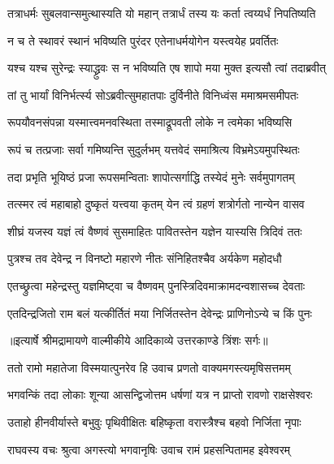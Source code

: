 \twolineshloka
{तत्राधर्मः सुबलवान्समुत्थास्यति यो महान्}
{तत्रार्धं तस्य यः कर्ता त्वय्यर्धं निपतिष्यति} %

\twolineshloka
{न च ते स्थावरं स्थानं भविष्यति पुरंदर}
{एतेनाधर्मयोगेन यस्त्वयेह प्रवर्तितः} %

\twolineshloka
{यश्च यश्च सुरेन्द्रः स्याद्ध्रुवः स न भविष्यति}
{एष शापो मया मुक्त इत्यसौ त्वां तदाब्रवीत्} %

\twolineshloka
{तां तु भार्यां विनिर्भर्त्स्य सोऽब्रवीत्सुमहातपाः}
{दुर्विनीते विनिध्वंस ममाश्रमसमीपतः} %

\twolineshloka
{रूपयौवनसंपन्ना यस्मात्त्वमनवस्थिता}
{तस्माद्रूपवती लोके न त्वमेका भविष्यसि} %

\twolineshloka
{रूपं च तत्प्रजाः सर्वा गमिष्यन्ति सुदुर्लभम्}
{यत्तवेदं समाश्रित्य विभ्रमेऽयमुपस्थितः} %

\twolineshloka
{तदा प्रभृति भूयिष्ठं प्रजा रूपसमन्विताः}
{शापोत्सर्गाद्धि तस्येदं मुनेः सर्वमुपागतम्} %

\twolineshloka
{तत्स्मर त्वं महाबाहो दुष्कृतं यत्त्वया कृतम्}
{येन त्वं ग्रहणं शत्रोर्गतो नान्येन वासव} %

\twolineshloka
{शीघ्रं यजस्व यज्ञं त्वं वैष्णवं सुसमाहितः}
{पावितस्तेन यज्ञेन यास्यसि त्रिदिवं ततः} %

\twolineshloka
{पुत्रश्च तव देवेन्द्र न विनष्टो महारणे}
{नीतः संनिहितश्चैव अर्यकेण महोदधौ} %

\twolineshloka
{एतच्छ्रुत्वा महेन्द्रस्तु यज्ञमिष्ट्वा च वैष्णवम्}
{पुनस्त्रिदिवमाक्रामदन्वशासच्च देवताः} %

\twolineshloka
{एतदिन्द्रजितो राम बलं यत्कीर्तितं मया}
{निर्जितस्तेन देवेन्द्रः प्राणिनोऽन्ये च किं पुनः} %


{॥इत्यार्षे श्रीमद्रामायणे वाल्मीकीये आदिकाव्ये उत्तरकाण्डे त्रिंशः सर्गः॥}


\twolineshloka
{ततो रामो महातेजा विस्मयात्पुनरेव हि}
{उवाच प्रणतो वाक्यमगस्त्यमृषिसत्तमम्} %

\twolineshloka
{भगवन्किं तदा लोकाः शून्या आसन्द्विजोत्तम}
{धर्षणां यत्र न प्राप्तो रावणो राक्षसेश्वरः} %

\twolineshloka
{उताहो हीनवीर्यास्ते बभुवुः पृथिवीक्षितः}
{बहिष्कृता वरास्त्रैश्च बहवो निर्जिता नृपाः} %

\twolineshloka
{राघवस्य वचः श्रुत्वा अगस्त्यो भगवानृषिः}
{उवाच रामं प्रहसन्पितामह इवेश्वरम्} %

